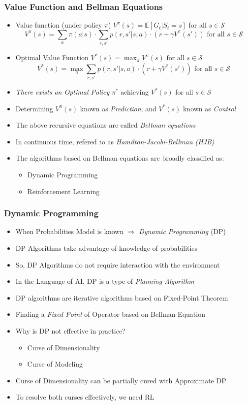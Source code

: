 \documentclass[handout]{beamer}
\begin{document}
\begin{frame}
\frametitle{Value Function and Bellman Equations}
\pause
\begin{itemize}
\item Value function (under policy $\pi$) $V^{\pi}(s) = \mathbb{E}[G_t|S_t = s]$ for all $s \in \mathcal{S}$
\pause
$$V^{\pi}(s) = \sum_{a} \pi(a|s) \cdot \sum_{r,s'} p(r,s'|s,a) \cdot (r + \gamma V^{\pi}(s')) \mbox{ for all } s \in \mathcal{S}$$
\pause
\item Optimal Value Function $V^*(s) = \max_{\pi} V^{\pi}(s) \mbox{ for all } s \in \mathcal{S}$
\pause
$$V^{*}(s) = \max_{a} \sum_{r,s'} p(r,s'|s,a) \cdot (r + \gamma V^*(s')) \mbox{ for all } s \in \mathcal{S}$$
\pause
\item {\em There exists an Optimal Policy} $\pi^*$ achieving $V^*(s)$ for all $s \in \mathcal{S}$
\pause
\item Determining $V^{\pi}(s)$ known as {\em Prediction}, and $V^*(s)$ known as {\em Control}
\pause
\item The above recursive equations are called {\em Bellman equations}
\pause
\item In continuous time, refered to as {\em Hamilton-Jacobi-Bellman (HJB)}
\pause
\item The algorithms based on Bellman equations are broadly classified as:
\begin{itemize}
\item Dynamic Programming
\item Reinforcement Learning
\end{itemize}

\end{itemize}
\end{frame}


\begin{frame}
\frametitle{Dynamic Programming}
\pause
\begin{itemize}[<+->]
\item When Probabilities Model is known $\Rightarrow$ {\em Dynamic Programming} (DP)
\item DP Algorithms take advantage of knowledge of probabilities
\item So, DP Algorithms do not require interaction with the environment
\item In the Language of AI, DP is a type of {\em Planning Algorithm}
\item DP algorithms are iterative algorithms based on Fixed-Point Theorem
\item Finding a {\em Fixed Point} of Operator based on Bellman Equation
\item Why is DP not effective in practice?
\pause
\begin{itemize}[<+->]
\item Curse of Dimensionality
\item Curse of Modeling
\end{itemize}
\item Curse of Dimensionality can be partially cured with Approximate DP
\item To resolve both curses effectively, we need RL
\end{itemize}
\end{frame}
\end{document}
